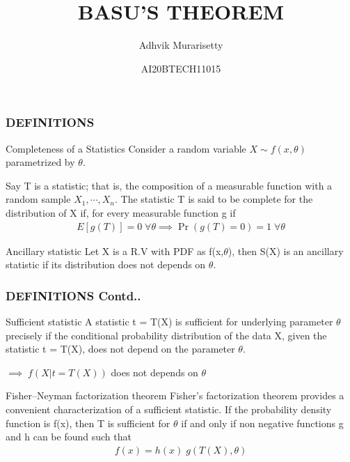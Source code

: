 \documentclass{beamer}
\title{BASU'S THEOREM}
\author{Adhvik Murarisetty}
\date{AI20BTECH11015}
\providecommand{\pr}[1]{\ensuremath{\Pr\left(#1\right)}}
\providecommand{\pr}[1]{\ensuremath{\Pr\left(#1\right)}}
\providecommand{\brak}[1]{\ensuremath{\left(#1\right)}}
\begin{document}
\begin{frame}
\titlepage
\end{frame}

\begin{frame}
\frametitle{DEFINITIONS}
\begin{block}{Completeness of a Statistics}
Consider a random variable $X\sim f\brak{x,\theta}$ parametrized by $\theta$.

Say T is a statistic; that is, the composition of a measurable function with a random sample $X_1,\cdots,X_n$.
The statistic T is said to be complete for the distribution of X if, for every
measurable function g if
\begin{align}
    E[g(T)]=0\;\forall\theta\implies\pr{g(T)=0}=1\;\forall\theta
\end{align}
\end{block}
\begin{block}{Ancillary statistic}
    Let X is a R.V with PDF as f(x,$\theta$), then 
    S(X) is an ancillary statistic if its distribution does not depends on $\theta$.
\end{block}
\end{frame}

\begin{frame}
\frametitle{DEFINITIONS Contd..}
\begin{block}{Sufficient statistic}
A statistic t = T(X) is sufficient for underlying parameter $\theta$ precisely if the conditional probability distribution of the data X, given the statistic t = T(X), does not depend on the parameter $\theta$.

    $\implies\; f(X|t=T(X))$ does not depends on $\theta$

\begin{block}{Fisher–Neyman factorization theorem}
    Fisher's factorization theorem provides a convenient characterization of a sufficient statistic. If the probability density function is ƒ(x), then T is sufficient for $\theta$ if and only if non negative functions g and h can be found such that
\begin{align}
    f(x)=h(x)\;g(T(X),\theta)
\end{align}
\end{block}
\end{block}
\end{frame}
\end{document}
